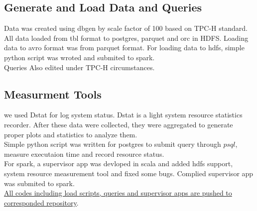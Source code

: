 \documentclass[../main.tex]{subfiles}
\begin{document}
    \subsection{Generate and Load Data and Queries}
    Data was created using dbgen by scale factor of 100 based on TPC-H standard. All data loaded from tbl format to postgres, parquet and orc in HDFS. Loading data to avro format was from parquet format. For loading data to hdfs, simple python script was wroted and submited to spark.\\
    Queries Also edited under TPC-H circumstances.
    
    \subsection{Measurment Tools}
    we used Dstat for log system status. Dstat is a light system resource statistics recorder. After these data were collected, they were aggregated to generate proper plots and statistics to analyze them.\\
    Simple python script was written for postgres to submit query through $psql$, measure executaion time and record resource status.\\
    For spark,  a supervisor app was devloped in scala and added hdfs support, system resource measurement tool and fixed some bugs. Complied supervisor app was submited to spark.\\

    \href{https://github.com/erfan-mehraban/tpc-benchmark}{All codes including load scripts, queries and supervisor apps are pushed to corresponded repository}.\\
\end{document}
